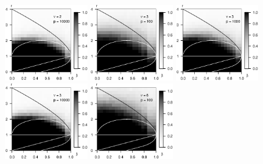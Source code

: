 \begin{figure}
      \includegraphics[width=0.32\textwidth]{./sim_approx-exact_boundary/simulated_approx-exact_boundary_chi-squared_nu2_p10000.eps}
      \includegraphics[width=0.32\textwidth]{./sim_approx-exact_boundary/simulated_approx-exact_boundary_chi-squared_nu3_p100.eps}
      \includegraphics[width=0.32\textwidth]{./sim_approx-exact_boundary/simulated_approx-exact_boundary_chi-squared_nu3_p1000.eps}
      \includegraphics[width=0.32\textwidth]{./sim_approx-exact_boundary/simulated_approx-exact_boundary_chi-squared_nu3_p10000.eps}
      \includegraphics[width=0.32\textwidth]{./sim_approx-exact_boundary/simulated_approx-exact_boundary_chi-squared_nu6_p100.eps}

\end{figure}
